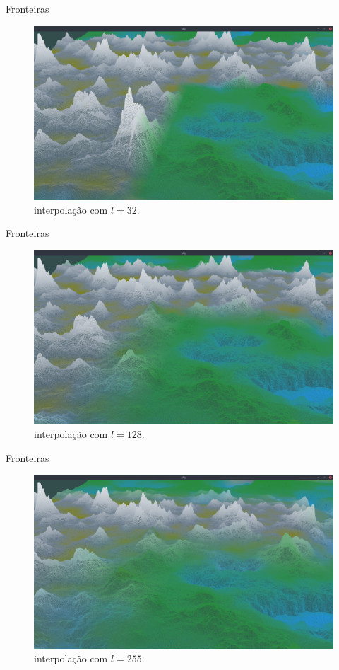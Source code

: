 \begin{frame}{Fronteiras}
    \begin{figure}[H]
        \centering
        \includegraphics[width=.9\textwidth]{img/borders/32lm.png}
        \caption{interpolação com $l = 32$.}
        \label{fig:img_borders_32lm}
    \end{figure}
    
\end{frame}

\begin{frame}{Fronteiras}
    \begin{figure}[H]
        \centering
        \includegraphics[width=.9\textwidth]{img/borders/128lm.png}
        \caption{interpolação com $l = 128$.}
        \label{fig:img_borders_128lm}
    \end{figure}
    
\end{frame}

\begin{frame}{Fronteiras}
    \begin{figure}[H]
        \centering
        \includegraphics[width=.9\textwidth]{img/borders/255lm.png}
        \caption{interpolação com $l = 255$.}
        \label{fig:img_borders_255lm}
    \end{figure}
    
\end{frame}